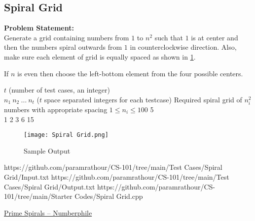 \documentclass[../../Problems]{subfiles}
\begin{document}
\subsection{Spiral Grid}
\textbf{Problem Statement:}\\
Generate a grid containing numbers from $1$ to $n^2$ such that $1$ is at center and then the numbers spiral outwards from $1$ in counterclockwise direction. Also, make sure each element of grid is equally spaced as shown in \ref{fig:spiralgrid}.
\begin{note}
	If $n$ is even then choose the left-bottom element from the four possible centers.
\end{note}
\begin{comment}
	\begin{figure}[H]
		\centering
		\begin{subfigure}{0.4\linewidth}
			\centering
			\begin{tabular}{rrrr}
			16 & 15 & 14 & 13 \\
			5  & 4  & 3  & 12 \\
			6  & 1  & 2  & 11 \\
			7  & 8  & 9  & 10
			\end{tabular}
			\caption{$n=4$}
		\end{subfigure}
		\begin{subfigure}{0.4\linewidth}
			\centering
			\begin{tabular}{rrrrr}
			17 & 16 & 15 & 14 & 13 \\
			18 & 5  & 4  & 3  & 12 \\
			19 & 6  & 1  & 2  & 11 \\
			20 & 7  & 8  & 9  & 10 \\
			21 & 22 & 23 & 24 & 25
			\end{tabular}
			\caption{$n=5$}
		\end{subfigure}
		\caption{Spiral Grid}
		\label{fig:spiralgrid}
	\end{figure}
\end{comment}
\begin{testcasesMore}
	{$t$ \hfill(number of test cases, an integer)\\$n_1\ n_2\ \ldots\ n_t$ \hfill($t$ space separated integers for each testcase)}
	{Required spiral grid of $n_i^2$ numbers with appropriate spacing}
	{$1 \leq n_i \leq 100$}
	{5\\1 2 3 6 15}
	{\vspace{-2em}\begin{figure}[H]
		\texttt{[image: Spiral Grid.png]}
		\caption{Sample Output}
		\label{fig:spiralgrid}
	\end{figure}
	}
	{https://github.com/paramrathour/CS-101/tree/main/Test Cases/Spiral Grid/Input.txt}
	{https://github.com/paramrathour/CS-101/tree/main/Test Cases/Spiral Grid/Output.txt}
	{https://github.com/paramrathour/CS-101/tree/main/Starter Codes/Spiral Grid.cpp}
\end{testcasesMore}
\begin{funvideo}
\href{https://youtu.be/iFuR97YcSLM}{Prime Spirals -- Numberphile}
\end{funvideo}
\end{document}
